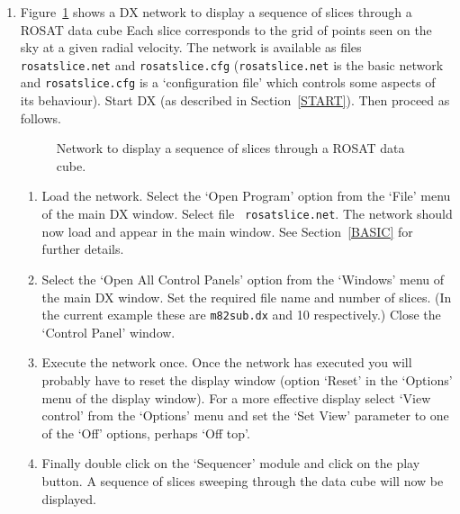 \documentclass[twoside,11pt]{article}
\begin{document}
\begin{enumerate}
  \item Figure~\ref{ROSATSLICE} shows a DX network to display a sequence
   of slices through a ROSAT data cube Each slice corresponds to the
   grid of points seen on the sky at a given radial velocity.  The network
   is available as files {\tt rosatslice.net} and {\tt rosatslice.cfg}
   ({\tt rosatslice.net} is the basic network and {\tt rosatslice.cfg} is
   a `configuration file' which controls some aspects of its behaviour).
   Start DX (as described in Section~\ref{START}).  Then proceed as
   follows.

  \begin{figure}[htbp]

  \begin{center}
  \leavevmode
  \epsfxsize=450pt
  \end{center}

  \caption[Network to display a sequence of slices through a ROSAT
   data cube.]{Network to display a sequence of slices through a ROSAT
   data cube. \label{ROSATSLICE} }

  \end{figure}

  \begin{enumerate}

    \item Load the network.  Select the `Open Program' option from the
     `File' menu of the main DX window.  Select file {\tt
     rosatslice.net}.  The network should now load and appear in the
     main window.  See Section~\ref{BASIC} for further details.

    \item Select the `Open All Control Panels' option from the `Windows'
     menu of the main DX window.  Set the required file name and
     number of slices.  (In the current example these are {\tt m82sub.dx}
     and 10 respectively.)  Close the `Control Panel' window.

    \item Execute the network once.  Once the network has executed you
     will probably have to reset the display window (option `Reset' in
     the `Options' menu of the display window).  For a more effective
     display select `View control' from the `Options' menu and set the
     `Set View' parameter to one of the `Off' options, perhaps `Off top'.

    \item Finally double click on the `Sequencer' module and click on
     the play button.  A sequence of slices sweeping through the data
     cube will now be displayed.


\end{enumerate}
\end{enumerate}
\end{document}

